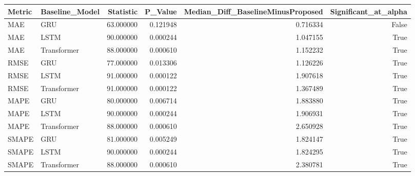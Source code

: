 \begin{tabular}{llrrrr}
\toprule
Metric & Baseline_Model & Statistic & P_Value & Median_Diff_BaselineMinusProposed & Significant_at_alpha \\
\midrule
MAE & GRU & 63.000000 & 0.121948 & 0.716334 & False \\
MAE & LSTM & 90.000000 & 0.000244 & 1.047155 & True \\
MAE & Transformer & 88.000000 & 0.000610 & 1.152232 & True \\
RMSE & GRU & 77.000000 & 0.013306 & 1.126226 & True \\
RMSE & LSTM & 91.000000 & 0.000122 & 1.907618 & True \\
RMSE & Transformer & 91.000000 & 0.000122 & 1.367489 & True \\
MAPE & GRU & 80.000000 & 0.006714 & 1.883880 & True \\
MAPE & LSTM & 90.000000 & 0.000244 & 1.906931 & True \\
MAPE & Transformer & 88.000000 & 0.000610 & 2.650928 & True \\
SMAPE & GRU & 81.000000 & 0.005249 & 1.824147 & True \\
SMAPE & LSTM & 90.000000 & 0.000244 & 1.824295 & True \\
SMAPE & Transformer & 88.000000 & 0.000610 & 2.380781 & True \\
\bottomrule
\end{tabular}
